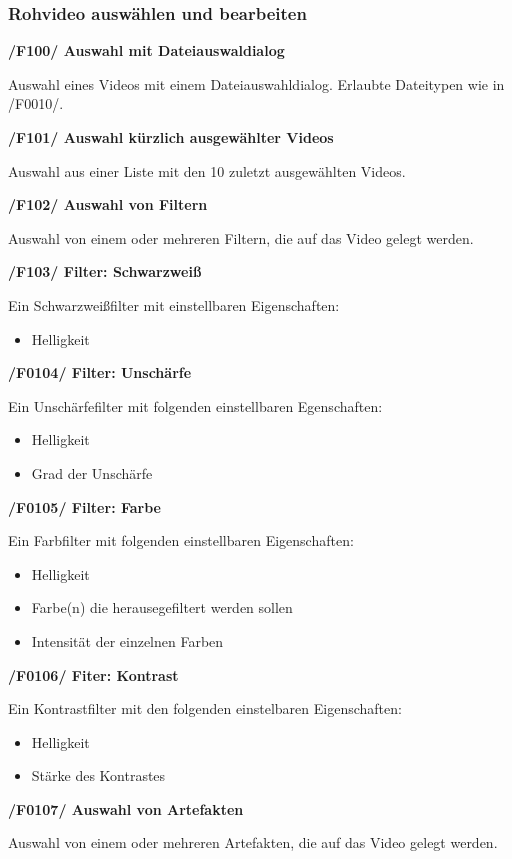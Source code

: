\documentclass[parskip=full]{scrartcl}
\begin{document}
\subsubsection{Rohvideo auswählen und bearbeiten}
\textbf{/F100/ Auswahl mit Dateiauswaldialog}

Auswahl eines Videos mit einem Dateiauswahldialog. Erlaubte Dateitypen wie in /F0010/.

\textbf{/F101/ Auswahl kürzlich ausgewählter Videos}

Auswahl aus einer Liste mit den 10 zuletzt ausgewählten Videos.

\textbf{/F102/ Auswahl von Filtern}

Auswahl von einem oder mehreren Filtern, die auf das Video gelegt werden.

\textbf{/F103/ Filter: Schwarzweiß}

Ein Schwarzweißfilter mit einstellbaren Eigenschaften:
\begin{itemize}
\item Helligkeit
\end{itemize}
\newpage
\textbf{/F0104/ Filter: Unschärfe}

Ein Unschärfefilter mit folgenden einstellbaren Egenschaften:
\begin{itemize}
\item Helligkeit
\item Grad der Unschärfe
\end{itemize}

\textbf{/F0105/ Filter: Farbe}

Ein Farbfilter mit folgenden einstellbaren Eigenschaften:
\begin{itemize}
\item Helligkeit
\item Farbe(n) die herausegefiltert werden sollen
\item Intensität der einzelnen Farben
\end{itemize}

\textbf{/F0106/ Fiter: Kontrast}

Ein Kontrastfilter mit den folgenden einstelbaren Eigenschaften:
\begin{itemize}
\item Helligkeit
\item Stärke des Kontrastes
\end{itemize}

\textbf{/F0107/ Auswahl von Artefakten}

Auswahl von einem oder mehreren Artefakten, die auf das Video gelegt werden.
\end{document}
